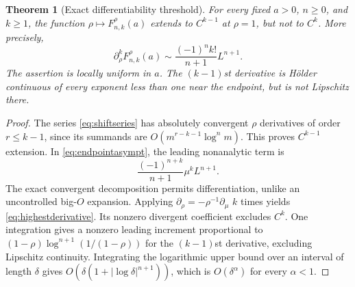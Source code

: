 \documentclass[11pt]{article}
\numberwithin{equation}{section}
\newtheorem{theorem}{Theorem}[section]
\theoremstyle{definition}\newtheorem{definition}[theorem]{Definition}
\theoremstyle{remark}\newtheorem{remark}[theorem]{Remark}
\begin{document}
\begin{theorem}[Exact differentiability threshold]\label{thm:regularity}
For every fixed $a>0$, $n\geq0$, and $k\geq1$, the function $\rho\mapsto F_{n,k}^{\rho}(a)$ extends to $C^{k-1}$ at $\rho=1$, but not to $C^k$. More precisely,
\begin{equation}\label{eq:highestderivative}
\partial_\rho^k F_{n,k}^{\rho}(a)
\sim \frac{(-1)^n k!}{n+1}L^{n+1}.
\end{equation}
The assertion is locally uniform in $a$. The $(k-1)$st derivative is H\"older continuous of every exponent less than one near the endpoint, but is not Lipschitz there.
\end{theorem}
\begin{proof}
The series \eqref{eq:shiftseries} has absolutely convergent $\rho$ derivatives of order $r\leq k-1$, since its summands are $O(m^{r-k-1}\log^n m)$. This proves $C^{k-1}$ extension. In \eqref{eq:endpointasympt}, the leading nonanalytic term is
\begin{equation}\label{eq:sing-leading}
\frac{(-1)^{n+k}}{n+1}\mu^k L^{n+1}.
\end{equation}
The exact convergent decomposition permits differentiation, unlike an uncontrolled big-$O$ expansion. Applying $\partial_\rho=-\rho^{-1}\partial_\mu$ $k$ times yields \eqref{eq:highestderivative}. Its nonzero divergent coefficient excludes $C^k$. One integration gives a nonzero leading increment proportional to $(1-\rho)\log^{n+1}(1/(1-\rho))$ for the $(k-1)$st derivative, excluding Lipschitz continuity. Integrating the logarithmic upper bound over an interval of length $\delta$ gives $O(\delta(1+|\log\delta|^{n+1}))$, which is $O(\delta^\alpha)$ for every $\alpha<1$.
\end{proof}
\end{document}
